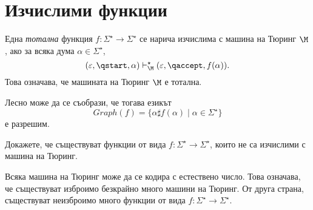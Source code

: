 \section{Изчислими функции}

Една {\em тотална} функция $f:\Sigma^\star \to \Sigma^\star$ се нарича изчислима с машина на Тюринг $\M$, ако 
за всяка дума $\alpha \in \Sigma^\star$,
\[(\varepsilon, \qstart, \alpha) \vdash^\star_\M (\varepsilon, \qaccept, f(\alpha)).\]
Това означава, че машината на Тюринг $\M$ е тотална.

Лесно може да се съобрази, че тогава езикът
\[Graph(f) = \{\alpha\sharp f(\alpha) \mid \alpha \in \Sigma^\star\}\]
е разрешим.

\begin{problem}
  Докажете, че съществуват функции от вида $f:\Sigma^\star\to\Sigma^\star$, които не са изчислими с машина на Тюринг.
\end{problem}
\begin{hint}
  Всяка машина на Тюринг може да се кодира с естествено число.
  Това означава, че съществуват изброимо безкрайно много машини на Тюринг.
  От друга страна, съществуват неизброимо много функции от вида $f:\Sigma^\star \to \Sigma^\star$.
\end{hint}


